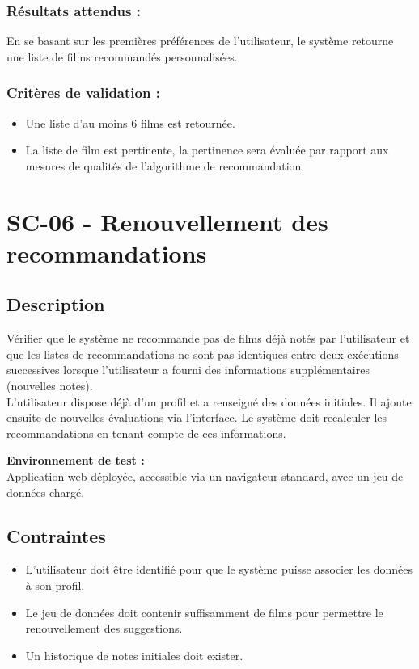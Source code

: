 \documentclass[a4paper,12pt]{report}
\begin{document}
\subsubsection{Résultats attendus :}
En se basant sur les premières préférences de l’utilisateur, le système retourne une liste de films recommandés personnalisées.
\subsubsection{Critères de validation :}
\begin{itemize}
    \item Une liste d’au moins 6 films est retournée.
    \item La liste de film est pertinente, la pertinence sera évaluée par rapport aux mesures de qualités de l’algorithme de recommandation.
\end{itemize}
\newpage

\section{SC-06 - Renouvellement des recommandations}
\label{Rec2}
\subsection*{Description}
Vérifier que le système ne recommande pas de films déjà notés par l'utilisateur et que les listes de recommandations ne sont pas identiques entre deux exécutions successives lorsque l'utilisateur a fourni des informations supplémentaires (nouvelles notes).\\
L'utilisateur dispose déjà d'un profil et a renseigné des données initiales. Il ajoute ensuite de nouvelles évaluations via l'interface. Le système doit recalculer les recommandations en tenant compte de ces informations.

\textbf{Environnement de test : }\\
Application web déployée, accessible via un navigateur standard, avec un jeu de données chargé.


\subsection*{Contraintes}
\begin{itemize}
    \item L'utilisateur doit être identifié pour que le système puisse associer les données à son profil. 
    \item Le jeu de données doit contenir suffisamment de films pour permettre le renouvellement des suggestions.
    \item Un historique de notes initiales doit exister. 
\end{itemize}
\end{document}
